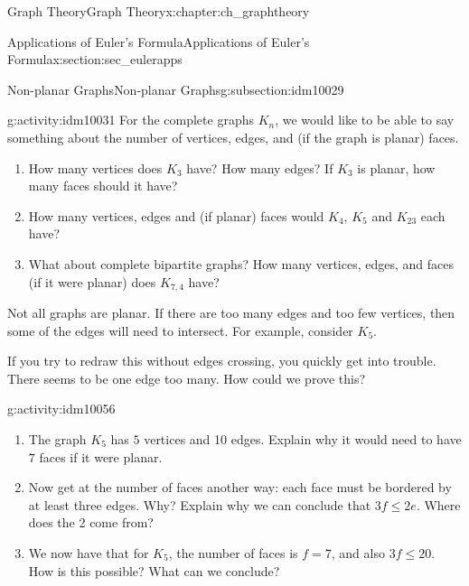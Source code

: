 \documentclass[oneside,10pt,]{book}
\numberwithin{equation}{chapter}
\newcommand{\vtx}[2]{node[fill,circle,inner sep=0pt, minimum size=4pt,label=#1:#2]{}}
\renewcommand{\v}{\vtx{above}{}}
\begin{document}
\begin{chapterptx}{Graph Theory}{}{Graph Theory}{}{}{x:chapter:ch_graphtheory}
\begin{sectionptx}{Applications of Euler's Formula}{}{Applications of Euler's Formula}{}{}{x:section:sec_eulerapps}
\begin{subsectionptx}{Non-planar Graphs}{}{Non-planar Graphs}{}{}{g:subsection:idm10029}
\begin{activity}{}{g:activity:idm10031}%
For the complete graphs \(K_n\), we would like to be able to say something about the number of vertices, edges, and (if the graph is planar) faces.%
\begin{enumerate}[font=\bfseries,label=(\alph*),ref=\alph*]
\item{}How many vertices does \(K_3\) have? How many edges?  If \(K_3\) is planar, how many faces should it have?%
\item{}How many vertices, edges and (if planar) faces would \(K_4\), \(K_5\) and \(K_{23}\) each have?%
\item{}What about complete bipartite graphs? How many vertices, edges, and faces (if it were planar) does \(K_{7,4}\) have?%
\end{enumerate}
\end{activity}
Not all graphs are planar. If there are too many edges and too few vertices, then some of the edges will need to intersect. For example, consider \(K_5\).%
\begin{sidebyside}{1}{0.4}{0.4}{0}%
\begin{sbspanel}{0.2}%
\resizebox{\linewidth}{!}{%
\begin{tikzpicture}
          \foreach \x in {0,...,4}
          \draw (\x*72+18:1) \v -- (\x*72+90:1) -- (\x*72-54:1);
        \end{tikzpicture}
}%
\end{sbspanel}%
\end{sidebyside}%
\par
If you try to redraw this without edges crossing, you quickly get into trouble. There seems to be one edge too many. How could we prove this?%
\begin{activity}{}{g:activity:idm10056}%
\begin{enumerate}[font=\bfseries,label=(\alph*),ref=\alph*]
\item{}The graph \(K_5\) has \(5\) vertices and 10 edges.  Explain why it would need to have \(7\) faces if it were planar.%
\item{}Now get at the number of faces another way: each face must be bordered by at least three edges.  Why?  Explain why we can conclude that \(3f \le 2e\).  Where does the 2 come from?%
\item{}We now have that for \(K_5\), the number of faces is \(f = 7\), and also \(3f \le 20\).  How is this possible?  What can we conclude?%
\end{enumerate}
\end{activity}

\end{subsectionptx}
\end{sectionptx}
\end{chapterptx}
\end{document}
